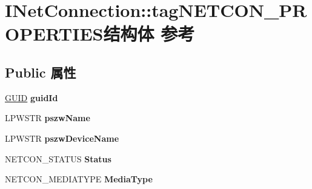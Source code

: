 \hypertarget{struct_i_net_connection_1_1tag_n_e_t_c_o_n___p_r_o_p_e_r_t_i_e_s}{}\section{I\+Net\+Connection\+:\+:tag\+N\+E\+T\+C\+O\+N\+\_\+\+P\+R\+O\+P\+E\+R\+T\+I\+E\+S结构体 参考}
\label{struct_i_net_connection_1_1tag_n_e_t_c_o_n___p_r_o_p_e_r_t_i_e_s}
\subsection*{Public 属性}
\begin{DoxyCompactItemize}
\item 
\mbox{\label{struct_i_net_connection_1_1tag_n_e_t_c_o_n___p_r_o_p_e_r_t_i_e_s_ad8ba0342012f49928dabfb853b8f6103}} 
\hyperlink{interface_g_u_i_d}{G\+U\+ID} {\bfseries guid\+Id}
\item 
\mbox{\label{struct_i_net_connection_1_1tag_n_e_t_c_o_n___p_r_o_p_e_r_t_i_e_s_a5ec1d7638c7b8f6d0994c97022feef80}} 
L\+P\+W\+S\+TR {\bfseries pszw\+Name}
\item 
\mbox{\label{struct_i_net_connection_1_1tag_n_e_t_c_o_n___p_r_o_p_e_r_t_i_e_s_abcb24cfa0c9b062eeb038276fa246ac9}} 
L\+P\+W\+S\+TR {\bfseries pszw\+Device\+Name}
\item 
\mbox{\label{struct_i_net_connection_1_1tag_n_e_t_c_o_n___p_r_o_p_e_r_t_i_e_s_afaba728a7f7f1f4f4e8af990ee8c15a2}} 
N\+E\+T\+C\+O\+N\+\_\+\+S\+T\+A\+T\+US {\bfseries Status}
\item 
\mbox{\label{struct_i_net_connection_1_1tag_n_e_t_c_o_n___p_r_o_p_e_r_t_i_e_s_aa6cbfe2ddacf34c4469dfef727c51f92}} 
N\+E\+T\+C\+O\+N\+\_\+\+M\+E\+D\+I\+A\+T\+Y\+PE {\bfseries Media\+Type}
\item 
\mbox{\label{struct_i_net_connection_1_1tag_n_e_t_c_o_n___p_r_o_p_e_r_t_i_e_s_a75aed9b862efe9c7d14340620fed9654}} 

\end{DoxyCompactItemize}
